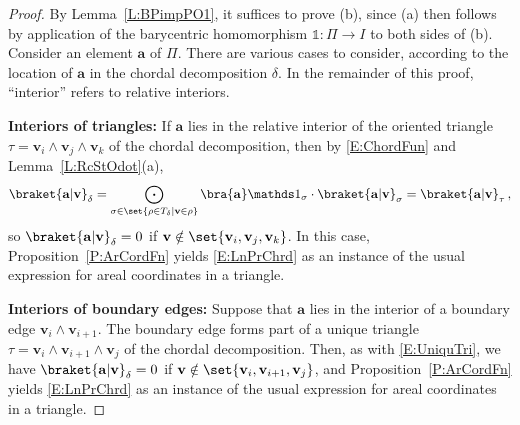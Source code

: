 \documentclass[12pt]{amsart}
\theoremstyle{plain}
\theoremstyle{definition}
\numberwithin{equation}{section}
\begin{document}
\begin{proof}
By Lemma~\ref{L:BPimpPO1}, it suffices to prove (b), since (a) then follows by application of the barycentric homomorphism $\mathds 1\colon\Pi\to I$ to both sides of (b). Consider an element $\mathbf a$ of $\Pi$. There are various cases to consider, according to the location of $\mathbf a$ in the chordal decomposition $\delta$. In the remainder of this proof, ``interior'' refers to relative interiors.


\vskip 2mm
\noindent
\textbf{Interiors of triangles:}
If $\mathbf a$ lies in the relative interior of the oriented triangle $\tau=\mathbf v_i\wedge \mathbf v_j\wedge \mathbf v_k$ of the chordal decomposition, then by \eqref{E:ChordFun} and Lemma~\ref{L:RcStOdot}(a),
\begin{equation}\label{E:UniquTri}
\braket{\mathbf a|\mathbf v}_\delta
=
\bigodot_{\sigma\in\set{\rho\in T_\delta|\mathbf v\in\rho}}\bra{\mathbf a}\mathds 1_\sigma\cdot\braket{\mathbf a|\mathbf v}_\sigma
=\braket{\mathbf a|\mathbf v}_\tau
\,,
\end{equation}
so $\braket{\mathbf a|\mathbf v}_\delta=0$ if $\mathbf v\notin\set{\mathbf v_i,\mathbf v_j,\mathbf v_k}$. In this case, Proposition~\ref{P:ArCordFn} yields \eqref{E:LnPrChrd} as an instance of the usual expression for areal coordinates in a triangle.


\vskip 2mm
\noindent
\textbf{Interiors of boundary edges:}
Suppose that $\mathbf a$ lies in the interior of a boundary edge $\mathbf v_i\wedge \mathbf v_{i+1}$.  The boundary edge forms part of a unique triangle $\tau=\mathbf v_i\wedge \mathbf v_{i+1}\wedge \mathbf v_j$ of the chordal decomposition. Then, as with \eqref{E:UniquTri}, we have $\braket{\mathbf a|\mathbf v}_\delta=0$ if $\mathbf v\notin\set{\mathbf v_i,\mathbf v_{i+1},\mathbf v_j}$, and  Proposition~\ref{P:ArCordFn} yields \eqref{E:LnPrChrd} as an instance of the usual expression for areal coordinates in a triangle.



\end{proof}
\end{document}
